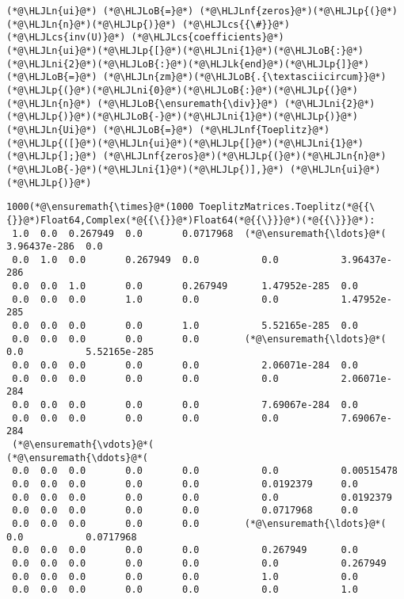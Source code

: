 \documentclass[12pt,a4paper]{article}
\newcommand{\HLJLk}[1]{\textcolor[RGB]{148,91,176}{\textbf{#1}}}
\newcommand{\HLJLn}[1]{#1}
\newcommand{\HLJLnf}[1]{\textcolor[RGB]{66,102,213}{#1}}
\newcommand{\HLJLni}[1]{\textcolor[RGB]{59,151,46}{#1}}
\newcommand{\HLJLoB}[1]{\textcolor[RGB]{102,102,102}{\textbf{#1}}}
\newcommand{\HLJLp}[1]{#1}
\newcommand{\HLJLcs}[1]{\textcolor[RGB]{153,153,119}{\textit{#1}}}
\begin{document}
\begin{lstlisting}
(*@\HLJLn{ui}@*) (*@\HLJLoB{=}@*) (*@\HLJLnf{zeros}@*)(*@\HLJLp{(}@*)(*@\HLJLn{n}@*)(*@\HLJLp{)}@*) (*@\HLJLcs{{\#}}@*) (*@\HLJLcs{inv(U)}@*) (*@\HLJLcs{coefficients}@*)
(*@\HLJLn{ui}@*)(*@\HLJLp{[}@*)(*@\HLJLni{1}@*)(*@\HLJLoB{:}@*)(*@\HLJLni{2}@*)(*@\HLJLoB{:}@*)(*@\HLJLk{end}@*)(*@\HLJLp{]}@*) (*@\HLJLoB{=}@*) (*@\HLJLn{zm}@*)(*@\HLJLoB{.{\textasciicircum}}@*)(*@\HLJLp{(}@*)(*@\HLJLni{0}@*)(*@\HLJLoB{:}@*)(*@\HLJLp{(}@*)(*@\HLJLn{n}@*) (*@\HLJLoB{\ensuremath{\div}}@*) (*@\HLJLni{2}@*)(*@\HLJLp{)}@*)(*@\HLJLoB{-}@*)(*@\HLJLni{1}@*)(*@\HLJLp{)}@*)
(*@\HLJLn{Ui}@*) (*@\HLJLoB{=}@*) (*@\HLJLnf{Toeplitz}@*)(*@\HLJLp{([}@*)(*@\HLJLn{ui}@*)(*@\HLJLp{[}@*)(*@\HLJLni{1}@*)(*@\HLJLp{];}@*) (*@\HLJLnf{zeros}@*)(*@\HLJLp{(}@*)(*@\HLJLn{n}@*)(*@\HLJLoB{-}@*)(*@\HLJLni{1}@*)(*@\HLJLp{)],}@*) (*@\HLJLn{ui}@*)(*@\HLJLp{)}@*)
\end{lstlisting}

\begin{lstlisting}
1000(*@\ensuremath{\times}@*(1000 ToeplitzMatrices.Toeplitz(*@{{\{}}@*)Float64,Complex(*@{{\{}}@*)Float64(*@{{\}}}@*)(*@{{\}}}@*):
 1.0  0.0  0.267949  0.0       0.0717968  (*@\ensuremath{\ldots}@*(  3.96437e-286  0.0
 0.0  1.0  0.0       0.267949  0.0           0.0           3.96437e-286
 0.0  0.0  1.0       0.0       0.267949      1.47952e-285  0.0
 0.0  0.0  0.0       1.0       0.0           0.0           1.47952e-285
 0.0  0.0  0.0       0.0       1.0           5.52165e-285  0.0
 0.0  0.0  0.0       0.0       0.0        (*@\ensuremath{\ldots}@*(  0.0           5.52165e-285
 0.0  0.0  0.0       0.0       0.0           2.06071e-284  0.0
 0.0  0.0  0.0       0.0       0.0           0.0           2.06071e-284
 0.0  0.0  0.0       0.0       0.0           7.69067e-284  0.0
 0.0  0.0  0.0       0.0       0.0           0.0           7.69067e-284
 (*@\ensuremath{\vdots}@*(                                        (*@\ensuremath{\ddots}@*(                
 0.0  0.0  0.0       0.0       0.0           0.0           0.00515478
 0.0  0.0  0.0       0.0       0.0           0.0192379     0.0
 0.0  0.0  0.0       0.0       0.0           0.0           0.0192379
 0.0  0.0  0.0       0.0       0.0           0.0717968     0.0
 0.0  0.0  0.0       0.0       0.0        (*@\ensuremath{\ldots}@*(  0.0           0.0717968
 0.0  0.0  0.0       0.0       0.0           0.267949      0.0
 0.0  0.0  0.0       0.0       0.0           0.0           0.267949
 0.0  0.0  0.0       0.0       0.0           1.0           0.0
 0.0  0.0  0.0       0.0       0.0           0.0           1.0
\end{lstlisting}
\end{document}
